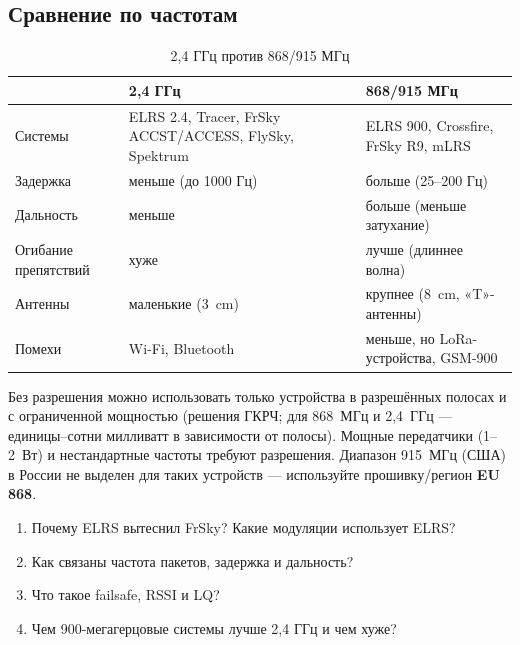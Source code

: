 \subsection{Сравнение по частотам}
\begin{table}[H]\centering\small
\renewcommand{\arraystretch}{1.25}
\begin{tabularx}{\linewidth}{@{}p{25mm} X X@{}}
\toprule
 & \textbf{2,4 ГГц} & \textbf{868/915 МГц} \\
\midrule
Системы & ELRS 2.4, Tracer, FrSky ACCST/ACCESS, FlySky, Spektrum & ELRS 900, Crossfire, FrSky R9, mLRS \\
Задержка & меньше (до 1000 Гц) & больше (25–200 Гц) \\
Дальность & меньше & больше (меньше затухание) \\
Огибание препятствий & хуже & лучше (длиннее волна) \\
Антенны & маленькие (\SI{3}{\centi\metre}) & крупнее (\SI{8}{\centi\metre}, «T»-антенны) \\
Помехи & Wi-Fi, Bluetooth & меньше, но LoRa-устройства, GSM-900 \\
\bottomrule
\end{tabularx}
\caption{2,4 ГГц против 868/915 МГц}
\end{table}

\begin{caution}
Без разрешения можно использовать только устройства в разрешённых полосах и с ограниченной мощностью (решения ГКРЧ; для 868~МГц и 2,4~ГГц — единицы–сотни милливатт в зависимости от полосы). Мощные передатчики (1–2~Вт) и нестандартные частоты требуют разрешения. Диапазон 915~МГц (США) в России не выделен для таких устройств — используйте прошивку/регион \textbf{EU 868}.
\end{caution}

\begin{exam}
\begin{enumerate}
\item Почему ELRS вытеснил FrSky? Какие модуляции использует ELRS?
\item Как связаны частота пакетов, задержка и дальность?
\item Что такое failsafe, RSSI и LQ?
\item Чем 900-мегагерцовые системы лучше 2,4 ГГц и чем хуже?
\end{enumerate}
\end{exam}
